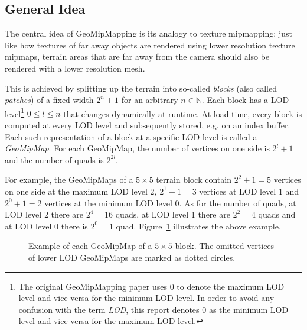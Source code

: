 \subsection{General Idea}
The central idea of GeoMipMapping is its analogy to texture mipmapping: just like how textures of far away objects are rendered using lower resolution texture mipmaps,
terrain areas that are far away from the camera should also be rendered with a lower resolution mesh.

This is achieved by splitting up the terrain into so-called \textit{blocks} (also called \textit{patches}) of a fixed width $2^n + 1$ for an arbitrary $n \in \mathbb{N}$.
Each block has a LOD level\footnote{The original GeoMipMapping paper uses 0 to denote the maximum LOD level and vice-versa for the minimum LOD level. In order to avoid any confusion with the term \textit{LOD}, this report denotes 0 as the minimum LOD level and vice versa for the maximum LOD level.} $0\leq l \leq n$ that changes dynamically at runtime.
At load time, every block is computed at every LOD level and subsequently stored, e.g. on an index buffer.
Each such representation of a block at a specific LOD level is called a \textit{GeoMipMap}.
For each GeoMipMap, the number of vertices on one side is $2^{l}+1$ and the number of quads is $2^{2l}$.

For example, the GeoMipMaps of a $5 \times 5$ terrain block contain $2^2 + 1 = 5$ vertices on one side at the maximum LOD level 2, $2^1 + 1 = 3$ vertices at LOD level 1 and $2^0 + 1 = 2$ vertices at the minimum LOD level 0.
As for the number of quads, at LOD level 2 there are $2^{4} = 16$ quads, at LOD level 1 there are $2^2 = 4$ quads and at LOD level 0 there is $2^0 = 1$ quad.
Figure~\ref{fig:geomipmapping-patch-example} illustrates the above example.


\begin{figure}[H]
  \centering
  \qquad
  \qquad
  \caption{Example of each GeoMipMap of a $5 \times 5$ block. The omitted vertices of lower LOD GeoMipMaps are marked as dotted circles.}\label{fig:geomipmapping-patch-example}
\end{figure}

